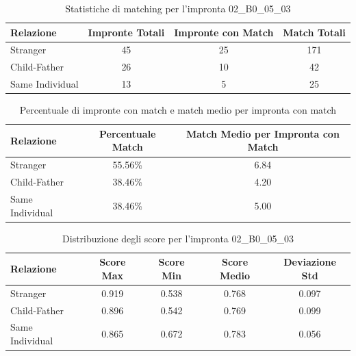 \begin{table}[htbp]
\centering
\caption{Statistiche di matching per l'impronta 02\_B0\_05\_03}
\label{tab:results_02_B0_05_03}
\begin{tabular}{|l|c|c|c|}
\hline
\textbf{Relazione} & \textbf{Impronte Totali} & \textbf{Impronte con Match} & \textbf{Match Totali} \\
\hline
Stranger & 45 & 25 & 171 \\
\hline
Child-Father & 26 & 10 & 42 \\
\hline
Same Individual & 13 & 5 & 25 \\
\hline
\end{tabular}
\end{table}


\begin{table}[htbp]
\centering
\caption{Percentuale di impronte con match e match medio per impronta con match}
\label{tab:match_percentage_02_B0_05_03}
\begin{tabular}{|l|c|c|}
\hline
\textbf{Relazione} & \textbf{Percentuale Match} & \textbf{Match Medio per Impronta con Match} \\
\hline
Stranger & 55.56\% & 6.84 \\
\hline
Child-Father & 38.46\% & 4.20 \\
\hline
Same Individual & 38.46\% & 5.00 \\
\hline
\end{tabular}
\end{table}


\begin{table}[htbp]
\centering
\caption{Distribuzione degli score per l'impronta 02\_B0\_05\_03}
\label{tab:scores_02_B0_05_03}
\begin{tabular}{|l|c|c|c|c|}
\hline
\textbf{Relazione} & \textbf{Score Max} & \textbf{Score Min} & \textbf{Score Medio} & \textbf{Deviazione Std} \\
\hline
Stranger & 0.919 & 0.538 & 0.768 & 0.097 \\
\hline
Child-Father & 0.896 & 0.542 & 0.769 & 0.099 \\
\hline
Same Individual & 0.865 & 0.672 & 0.783 & 0.056 \\
\hline
\end{tabular}
\end{table}


